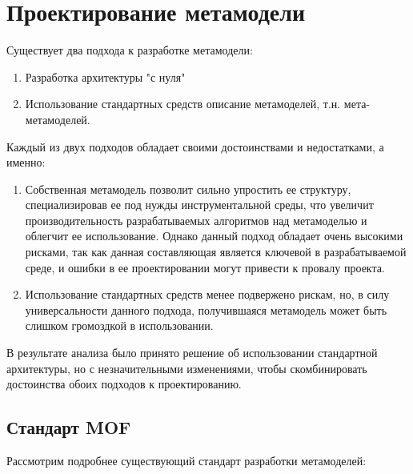 \section{Проектирование метамодели}
Существует два подхода к разработке метамодели:

\begin{enumerate}
    \item Разработка архитектуры "с нуля"
    \item Использование стандартных средств описание метамоделей, т.н.
    мета-метамоделей.
\end{enumerate}

Каждый из двух подходов обладает своими достоинствами и недостатками, а именно:

\begin{enumerate}
    \item Собственная метамодель позволит сильно упростить ее структуру,
    специализировав ее под нужды инструментальной среды, что увеличит
    производительность разрабатываемых алгоритмов над метамоделью и облегчит ее
    использование. Однако данный подход обладает очень высокими рисками, так как
    данная составляющая является ключевой в разрабатываемой среде, и ошибки в ее
    проектировании могут привести к провалу проекта.
    \item Использование стандартных средств менее подвержено рискам, но, в силу
    универсальности данного подхода, получившаяся метамодель может быть слишком
    громоздкой в использовании.
\end{enumerate}

В результате анализа было принято решение об использовании стандартной
архитектуры, но с незначительными изменениями, чтобы скомбинировать достоинства
обоих подходов к проектированию.

\subsection{Стандарт MOF}

Рассмотрим подробнее существующий стандарт разработки метамоделей:


